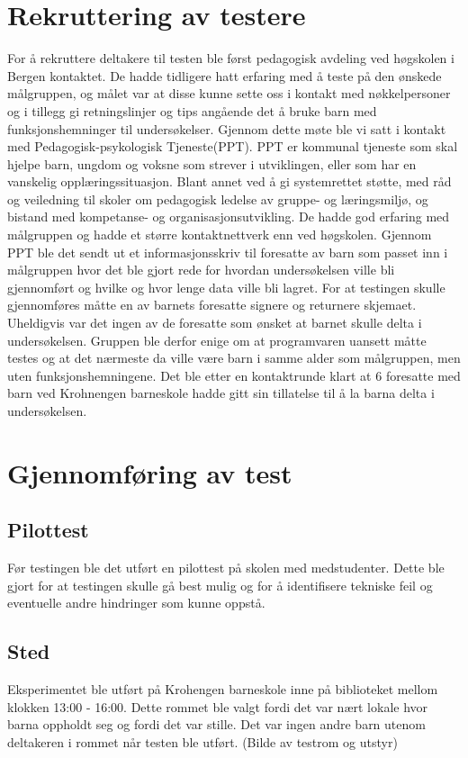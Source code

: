 
\section{Rekruttering av testere}

For å rekruttere deltakere til testen ble først pedagogisk avdeling ved høgskolen i Bergen
kontaktet. De hadde tidligere hatt erfaring med å teste på den ønskede målgruppen, og målet var
at disse kunne sette oss i kontakt med nøkkelpersoner og i tillegg gi retningslinjer og tips
angående det å bruke barn med funksjonshemninger til undersøkelser. Gjennom dette møte ble vi
satt i kontakt med Pedagogisk-psykologisk Tjeneste(PPT). PPT er kommunal tjeneste som skal
hjelpe barn, ungdom og voksne som strever i utviklingen, eller som har en vanskelig
opplæringssituasjon. Blant annet ved å gi systemrettet støtte, med råd og veiledning til skoler om
pedagogisk ledelse av gruppe- og læringsmiljø, og bistand med kompetanse- og
organisasjonsutvikling. De hadde god erfaring med målgruppen og hadde et større kontaktnettverk
enn ved høgskolen.
Gjennom PPT ble det sendt ut et informasjonsskriv til foresatte av barn som passet inn i
målgruppen hvor det ble gjort rede for hvordan undersøkelsen ville bli gjennomført og hvilke og
hvor lenge data ville bli lagret. For at testingen skulle gjennomføres måtte en av barnets foresatte
signere og returnere skjemaet. Uheldigvis var det ingen av de foresatte som ønsket at barnet
skulle delta i undersøkelsen.
Gruppen ble derfor enige om at programvaren uansett måtte testes og at det nærmeste da ville
være barn i samme alder som målgruppen, men uten funksjonshemningene.
Det ble etter en kontaktrunde klart at 6 foresatte med barn ved Krohnengen barneskole hadde gitt
sin tillatelse til å la barna delta i undersøkelsen.

\section{Gjennomføring av test}

\subsection{Pilottest}

Før testingen ble det utført en pilottest på skolen med medstudenter. Dette ble gjort for at testingen
skulle gå best mulig og for å identifisere tekniske feil og eventuelle andre hindringer som kunne
oppstå.

\subsection{Sted}
Eksperimentet ble utført på Krohengen barneskole inne på biblioteket mellom klokken 13:00 -
16:00. Dette rommet ble valgt fordi det var nært lokale hvor barna oppholdt seg og fordi det var
stille. Det var ingen andre barn utenom deltakeren i rommet når testen ble utført.
(Bilde av testrom og utstyr) 


